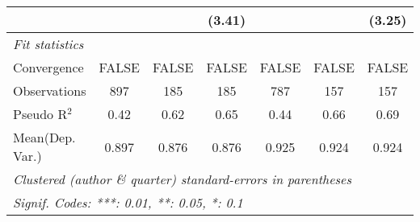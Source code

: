 \begin{tabular}{lcccccc}
                           &             &        & (3.41)      &         &              & (3.25)\\   
   \midrule
   \emph{Fit statistics}\\
   Convergence             &FALSE        & FALSE  & FALSE       & FALSE   & FALSE        & FALSE\\  
   Observations            & 897         & 185    & 185         & 787     & 157          & 157\\  
   Pseudo R$^2$            & 0.42        & 0.62   & 0.65        & 0.44    & 0.66         & 0.69\\  
Mean(Dep. Var.) & 0.897 & 0.876 & 0.876 & 0.925 & 0.924 & 0.924 \\
   \midrule \midrule
   \multicolumn{7}{l}{\emph{Clustered (author \& quarter) standard-errors in parentheses}}\\
   \multicolumn{7}{l}{\emph{Signif. Codes: ***: 0.01, **: 0.05, *: 0.1}}\\
\end{tabular}
\par\endgroup

